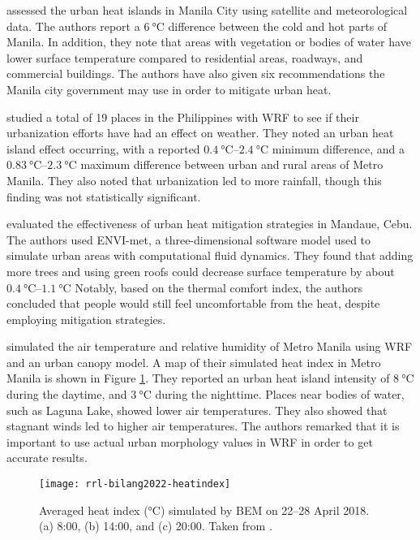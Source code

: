 		\textcite{Purio2022} assessed the urban heat islands in Manila City using satellite and meteorological data.
		The authors report a $\qty{6}{\degreeCelsius}$ difference between the cold and hot parts of Manila.
		In addition, they note that areas with vegetation or bodies of water have lower surface temperature compared to residential areas, roadways, and commercial buildings.
		The authors have also given six recommendations the Manila city government may use in order to mitigate urban heat.
		
		\textcite{Oliveros2019} studied a total of 19 places in the Philippines with WRF to see if their urbanization efforts have had an effect on weather.
		They noted an urban heat island effect occurring, with a reported
			$\qtyrange{0.4}{2.4}{\degreeCelsius}$ minimum difference, and a 
			$\qtyrange{0.83}{2.3}{\degreeCelsius}$ maximum difference
			between urban and rural areas of Metro Manila.
		They also noted that urbanization led to more rainfall, though this finding was not statistically significant.
		
		\textcite{Cortes2022} evaluated the effectiveness of urban heat mitigation strategies in Mandaue, Cebu.
		The authors used ENVI-met, a three-dimensional software model used to simulate urban areas with computational fluid dynamics.
		They found that adding more trees and using green roofs could decrease surface temperature by about $\qtyrange{0.4}{1.1}{\degreeCelsius}$
		Notably, based on the thermal comfort index, the authors concluded that people would still feel uncomfortable from the heat, despite employing mitigation strategies.
		
		\textcite{Bilang2022} simulated the air temperature and relative humidity of Metro Manila using WRF and an urban canopy model.
		A map of their simulated heat index in Metro Manila is shown in Figure \ref{fig:rrl-bilang2022-heatindex}.
		They reported an urban heat island intensity of $\qty{8}{\degreeCelsius}$ during the daytime, and
			$\qty{3}{\degreeCelsius}$ during the nighttime.
		Places near bodies of water, such as Laguna Lake, showed lower air temperatures.
		They also showed that stagnant winds led to higher air temperatures.
		The authors remarked that it is important to use actual urban morphology values in WRF in order to get accurate results.
		
		\begin{figure}
			\centering
			\texttt{[image: rrl-bilang2022-heatindex]}
			\caption{
				Averaged heat index (\unit{\degreeCelsius}) simulated by BEM on 22–28 April 2018.
				(a) 8:00, (b) 14:00, and (c) 20:00.
				Taken from \textcite{Bilang2022}.
			}
			\label{fig:rrl-bilang2022-heatindex}
			
		\end{figure}

